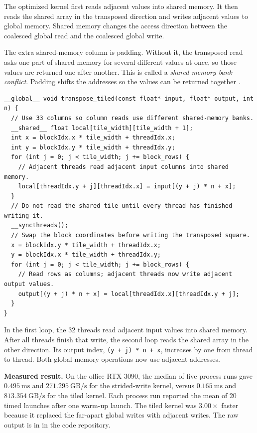 \documentclass[11pt]{article}
\numberwithin{equation}{section}
\numberwithin{figure}{section}
\numberwithin{table}{section}
\newcommand{\code}[1]{\texttt{#1}}
\begin{document}
The optimized kernel first reads adjacent values into shared memory.  It then reads
the shared array in the transposed direction and writes adjacent values to global
memory.  Shared memory changes the access direction between the coalesced global
read and the coalesced global write.

The extra shared-memory column is padding.  Without it, the transposed read asks
one part of shared memory for several different values at once, so those values are
returned one after another.  This is called a \emph{shared-memory bank conflict}.
Padding shifts the addresses so the values can be returned together
\cite{cuda-best-practices}.
\begin{lstlisting}[language=CUDA,basicstyle=\ttfamily\footnotesize,
  caption={Tiled transpose used in the experiment.}]
__global__ void transpose_tiled(const float* input, float* output, int n) {
  // Use 33 columns so column reads use different shared-memory banks.
  __shared__ float local[tile_width][tile_width + 1];
  int x = blockIdx.x * tile_width + threadIdx.x;
  int y = blockIdx.y * tile_width + threadIdx.y;
  for (int j = 0; j < tile_width; j += block_rows) {
    // Adjacent threads read adjacent input columns into shared memory.
    local[threadIdx.y + j][threadIdx.x] = input[(y + j) * n + x];
  }
  // Do not read the shared tile until every thread has finished writing it.
  __syncthreads();
  // Swap the block coordinates before writing the transposed square.
  x = blockIdx.y * tile_width + threadIdx.x;
  y = blockIdx.x * tile_width + threadIdx.y;
  for (int j = 0; j < tile_width; j += block_rows) {
    // Read rows as columns; adjacent threads now write adjacent output values.
    output[(y + j) * n + x] = local[threadIdx.x][threadIdx.y + j];
  }
}
\end{lstlisting}

In the first loop, the 32 threads read adjacent input values into shared memory.
After all threads finish that write, the second loop reads the shared array in the
other direction.  Its output index, \code{(y + j) * n + x}, increases by one from
thread to thread.  Both global-memory operations now use adjacent addresses.

\textbf{Measured result.}  On the office RTX 3090, the median of five process runs
gave $0.495\ \mathrm{ms}$ and $271.295\ \mathrm{GB/s}$ for the strided-write kernel,
versus $0.165\ \mathrm{ms}$ and $813.354\ \mathrm{GB/s}$ for the tiled kernel.  Each
process run reported the mean of 20 timed launches after one warm-up launch.  The
tiled kernel was $3.00\times$ faster because it replaced the far-apart global writes
with adjacent writes.  The raw output is in
 in the code repository.
\end{document}
